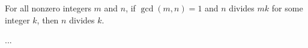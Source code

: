 \documentclass{article}
\begin{document}
\clearpage


\begin{lemma*}[Ch. 1, \#39] 
    For all nonzero integers $m$ and $n$, if $\gcd(m,n) = 1$ and $n$ divides $mk$ for some integer $k$, then $n$ divides $k$.
\end{lemma*}


\begin{prop*}[Ch. 3, \#53] ...
\end{prop*}
\end{document}
